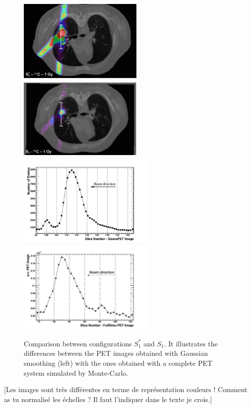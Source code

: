 \documentclass[11pt]{iopart}
\newcommand{\dsnote}[1]{{\color{green}[#1]}}
\begin{document}
\begin{figure}[!h]
  \centering
  \includegraphics[width=6cm,height=40mm]{figures/gaussPET_C11_v2.jpg}
  \includegraphics[width=6cm,height=40mm]{figures/C11_1Gy_v2.jpg}
  \includegraphics[width=65mm,height=45mm]{figures/prof_gaussPET_C11_v1.jpg}
  \includegraphics[width=65mm,height=45mm]{figures/1GyFullPET_v1.jpg}
  \caption{Comparison between configurations $S_{1}^{*}$ and
    $S_{1}$. It illustrates the differences between the PET images
    obtained with Gaussian smoothing (left) with the ones obtained
    with a complete PET system simulated by Monte-Carlo.}
  \label{fig:fig3}
\end{figure}

\dsnote{Les images sont très différentes en terme de représentation
  couleurs ! Comment as tu normalisé les échelles ? Il faut l'indiquer
  dans le texte je crois.}
\end{document}
